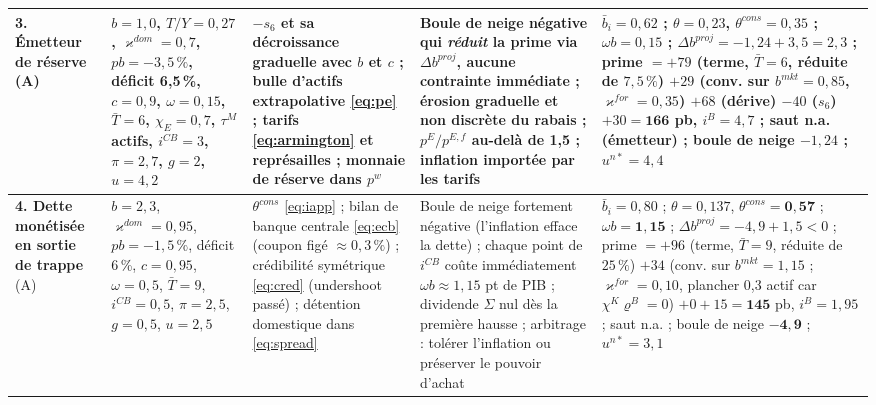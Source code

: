\documentclass[11pt,a4paper]{article}
\begin{document}
\begin{center}
\begin{longtable}{p{1.6cm}p{3.1cm}p{3.4cm}p{2.9cm}p{3.5cm}}
\midrule
\textbf{3. Émetteur de réserve} (A) & $b=1{,}0$, $T/Y=0{,}27$, $\varkappa^{dom}=0{,}7$, $pb=-3{,}5\,\%$, déficit 6,5\,\%, $c=0{,}9$, $\omega=0{,}15$, $\bar T=6$, $\chi_E=0{,}7$, $\tau^M$ actifs, $i^{CB}=3$, $\pi=2{,}7$, $g=2$, $u=4{,}2$ & $-s_6$ et sa décroissance graduelle avec $b$ et $c$ ; bulle d'actifs extrapolative \eqref{eq:pe} ; tarifs \eqref{eq:armington} et représailles ; monnaie de réserve dans $p^w$ & Boule de neige négative qui \emph{réduit} la prime via $\Delta b^{proj}$, aucune contrainte immédiate ; érosion graduelle et non discrète du rabais ; $p^E/p^{E,f}$ au-delà de 1,5 ; inflation importée par les tarifs & $\bar b_i=0{,}62$ ; $\theta=0{,}23$, $\theta^{cons}=0{,}35$ ; $\omega b=0{,}15$ ; $\Delta b^{proj}=-1{,}24+3{,}5=2{,}3$ ; prime $=+79$ (terme, $\bar T=6$, réduite de $7{,}5\,\%$) $+29$ (conv. sur $b^{mkt}=0{,}85$, $\varkappa^{for}=0{,}35$) $+68$ (dérive) $-40$ ($s_6$) $+30=\mathbf{166}$ pb, $i^B=4{,}7$ ; saut n.a. (émetteur) ; boule de neige $-1{,}24$ ; $u^{n\ast}=4{,}4$\\
\midrule
\textbf{4. Dette monétisée en sortie de trappe} (A) & $b=2{,}3$, $\varkappa^{dom}=0{,}95$, $pb=-1{,}5\,\%$, déficit 6\,\%, $c=0{,}95$, $\omega=0{,}5$, $\bar T=9$, $i^{CB}=0{,}5$, $\pi=2{,}5$, $g=0{,}5$, $u=2{,}5$ & $\theta^{cons}$ \eqref{eq:iapp} ; bilan de banque centrale \eqref{eq:ecb} (coupon figé $\approx0{,}3\,\%$) ; crédibilité symétrique \eqref{eq:cred} (undershoot passé) ; détention domestique dans \eqref{eq:spread} & Boule de neige fortement négative (l'inflation efface la dette) ; chaque point de $i^{CB}$ coûte immédiatement $\omega b\approx1{,}15$ pt de PIB ; dividende $\Sigma$ nul dès la première hausse ; arbitrage : tolérer l'inflation ou préserver le pouvoir d'achat & $\bar b_i=0{,}80$ ; $\theta=0{,}137$, $\theta^{cons}=\mathbf{0{,}57}$ ; $\omega b=\mathbf{1{,}15}$ ; $\Delta b^{proj}=-4{,}9+1{,}5<0$ ; prime $=+96$ (terme, $\bar T=9$, réduite de $25\,\%$) $+34$ (conv. sur $b^{mkt}=1{,}15$ ; $\varkappa^{for}=0{,}10$, plancher 0,3 actif car $\chi^K\varrho^B=0$) $+0+15=\mathbf{145}$ pb, $i^B=1{,}95$ ; saut n.a. ; boule de neige $\mathbf{-4{,}9}$ ; $u^{n\ast}=3{,}1$\\
\midrule

\end{longtable}
\end{center}
\end{document}

